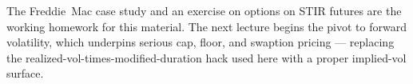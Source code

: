 The Freddie~Mac case study and an exercise on options on STIR futures
are the working homework for this material. The next lecture begins
the pivot to forward volatility, which underpins serious cap, floor,
and swaption pricing --- replacing the realized-vol-times-modified-duration
hack used here with a proper implied-vol surface.
